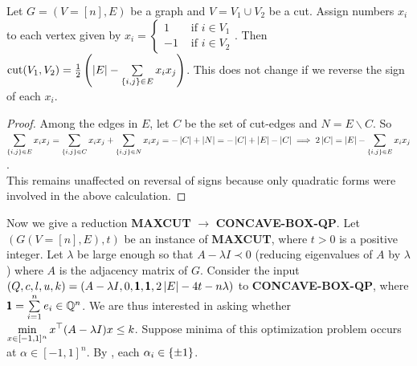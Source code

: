 \begin{lemma}\label{cut}
Let $G=(V=[n],E)$ be a graph and $V=V_{1}\cup V_{2}$ be a cut. Assign numbers $x_{i}$ to each vertex given by $x_{i} = \begin{cases}1&\text{ if } i\in V_{1} \\ -1&\text{ if } i\in V_{2} \end{cases}$. Then $\text{cut}(V_{1},V_{2}) = \frac12\left(\left| E \right| - \sum\limits_{\left\{i,j\right\}\in E}x_{i}x_{j}\right)$. This does not change if we reverse the sign of each $x_{i}$.
\end{lemma}
\begin{proof}
Among the edges in $E$, let $C$ be the set of cut-edges and $N=E\smallsetminus C$. So $\displaystyle\sum_{\left\{i,j\right\}\in E}x_{i}x_{j} = \sum_{\left\{i,j\right\}\in C}x_{i}x_{j} + \sum_{\left\{i,j\right\}\in N}x_{i}x_{j} = -\left| C \right| + \left| N \right| = -\left| C \right| + \left| E \right| - \left| C \right|\implies 2\left| C \right| = \left| E \right| - \sum_{\left\{i,j\right\}\in E}x_{i}x_{j}$. \\This remains unaffected on reversal of signs because only quadratic forms were involved in the above calculation.
\end{proof}



Now we give a reduction \textbf{MAXCUT} $\longrightarrow$ \textbf{CONCAVE-BOX-QP}. Let $(G(V=[n],E),t)$ be an instance of \textbf{MAXCUT}, where $t>0$ is a positive integer. Let $\lambda$ be large enough so that $A-\lambda I \prec 0$ (reducing eigenvalues of $A$ by $\lambda$) where $A$ is the adjacency matrix of $G$. Consider the input $(Q,c,l,u,k) = (A-\lambda I, 0, \pmb 1, \pmb 1, 2\left| E \right|-4t-n\lambda)$ to \textbf{CONCAVE-BOX-QP}, where $\pmb 1 = \sum\limits_{i=1}^{n} e_{i}\in\mathbb{Q}^{n}$. We are thus interested in asking whether $\displaystyle\min_{x\in [-1,1]^{n}} x^{\top}(A-\lambda I)x \le k$. Suppose minima of this optimization problem occurs at $\alpha\in [-1,1]^{n}$. By , each $\alpha_{i}\in \left\{\pm 1\right\}$.

